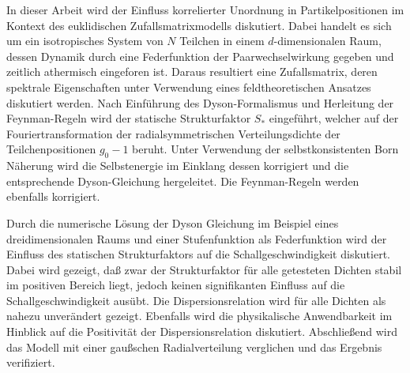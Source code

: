 In dieser Arbeit wird der Einfluss korrelierter Unordnung in Partikelpositionen im Kontext des euklidischen Zufallsmatrixmodells diskutiert. Dabei handelt es sich um ein isotropisches System von $N$ Teilchen in einem $d$-dimensionalen Raum, dessen Dynamik durch eine Federfunktion der Paarwechselwirkung gegeben und zeitlich athermisch eingeforen ist. Daraus resultiert eine Zufallsmatrix, deren spektrale Eigenschaften unter Verwendung eines feldtheoretischen Ansatzes diskutiert werden. Nach Einführung des Dyson-Formalismus und Herleitung der Feynman-Regeln wird der statische Strukturfaktor $S_*$ eingeführt, welcher auf der Fouriertransformation der radialsymmetrischen Verteilungsdichte der Teilchenpositionen $g_0 - 1$ beruht. Unter Verwendung der selbstkonsistenten Born Näherung wird die Selbstenergie im Einklang dessen korrigiert und die entsprechende Dyson-Gleichung hergeleitet. Die Feynman-Regeln werden ebenfalls korrigiert. 

Durch die numerische Lösung der Dyson Gleichung im Beispiel eines dreidimensionalen Raums und einer Stufenfunktion als Federfunktion wird der Einfluss des statischen Strukturfaktors auf die Schallgeschwindigkeit diskutiert. Dabei wird gezeigt, daß zwar der Strukturfaktor für alle getesteten Dichten stabil im positiven Bereich liegt, jedoch keinen signifikanten Einfluss auf die Schallgeschwindigkeit ausübt. Die Dispersionsrelation wird für alle Dichten als nahezu unverändert gezeigt. Ebenfalls wird die physikalische Anwendbarkeit im Hinblick auf die Positivität der Dispersionsrelation diskutiert. Abschließend wird das Modell mit einer gaußschen Radialverteilung verglichen und das Ergebnis verifiziert.